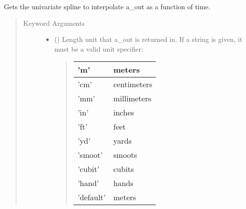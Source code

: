 \documentclass[letterpaper,10pt,english]{sphinxmanual}
\begin{document}
\begin{fulllineitems}
\begin{fulllineitems}
\begin{quote}
\begin{description}
\end{description}\end{quote}

\end{fulllineitems}


\begin{fulllineitems}
\label{\detokenize{eqtools:eqtools.core.Equilibrium.getAOutSpline}}
Gets the univariate spline to interpolate a\_out as a function of time.
\begin{quote}\begin{description}
\item[{Keyword Arguments}] \leavevmode\begin{itemize}
\item {} 
 () \textendash{} 
Length unit that a\_out is returned in. If
a string is given, it must be a valid unit specifier:
\begin{quote}


\begin{savenotes}\sphinxattablestart
\centering
\begin{tabulary}{\linewidth}[t]{|T|T|}
\hline

’m’
&
meters
\\
\hline
’cm’
&
centimeters
\\
\hline
’mm’
&
millimeters
\\
\hline
’in’
&
inches
\\
\hline
’ft’
&
feet
\\
\hline
’yd’
&
yards
\\
\hline
’smoot’
&
smoots
\\
\hline
’cubit’
&
cubits
\\
\hline
’hand’
&
hands
\\
\hline
’default’
&
meters
\\
\hline
\end{tabulary}
\par
\sphinxattableend\end{savenotes}
\end{quote}


\end{itemize}
\end{description}
\end{quote}
\end{fulllineitems}
\end{fulllineitems}
\end{document}
